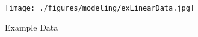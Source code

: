 \begin{figure}[ht!]
\texttt{[image: ./figures/modeling/exLinearData.jpg]}
\centering
\caption{Example Data}
\label{fig:exLinearData}
\end{figure}
